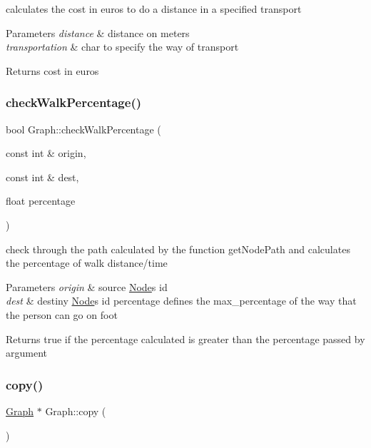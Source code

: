 calculates the cost in euros to do a distance in a specified transport 


\begin{DoxyParams}{Parameters}
{\em distance} & distance on meters \\
\hline
{\em transportation} & char to specify the way of transport \\
\hline
\end{DoxyParams}
\begin{DoxyReturn}{Returns}
cost in euros 
\end{DoxyReturn}
\mbox{\label{class_graph_aa8ec47961beb1b619d1d72e8205ebb63}} 
\subsubsection{\texorpdfstring{check\+Walk\+Percentage()}{checkWalkPercentage()}}
{\footnotesize\ttfamily bool Graph\+::check\+Walk\+Percentage (\begin{DoxyParamCaption}\item[{const int \&}]{origin,  }\item[{const int \&}]{dest,  }\item[{float}]{percentage }\end{DoxyParamCaption})}



check through the path calculated by the function get\+Node\+Path and calculates the percentage of walk distance/time 


\begin{DoxyParams}{Parameters}
{\em origin} & source \hyperlink{class_node}{Node}\textquotesingle{}s id \\
\hline
{\em dest} & destiny \hyperlink{class_node}{Node}\textquotesingle{}s id  percentage defines the max\+\_\+percentage of the way that the person can go on foot \\
\hline
\end{DoxyParams}
\begin{DoxyReturn}{Returns}
true if the percentage calculated is greater than the percentage passed by argument 
\end{DoxyReturn}
\mbox{\label{class_graph_ad8969dae6fcb6f982338c79f67fdbbda}} 
\subsubsection{\texorpdfstring{copy()}{copy()}}
{\footnotesize\ttfamily \hyperlink{class_graph}{Graph} $\ast$ Graph\+::copy (\begin{DoxyParamCaption}{ }\end{DoxyParamCaption})}



